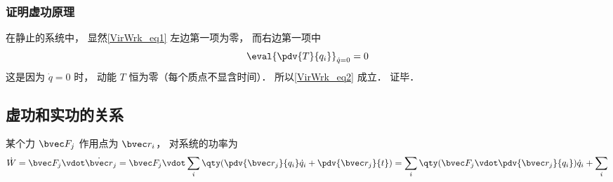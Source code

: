 \subsubsection{证明虚功原理}
在静止的系统中， 显然\autoref{VirWrk_eq1} 左边第一项为零， 而右边第一项中
\begin{equation}
\eval{\pdv{T}{q_i}}_{\dot q = 0} = 0
\end{equation}
这是因为 $\dot q = 0$ 时， 动能 $T$ 恒为零（每个质点不显含时间）． 所以\autoref{VirWrk_eq2} 成立． 证毕．


\subsection{虚功和实功的关系}
某个力 $\bvec F_j$ 作用点为 $\bvec r_i$， 对系统的功率为
\begin{equation}
\dot W = \bvec F_j \vdot \dot {\bvec r}_j
= \bvec F_j \vdot \sum_i \qty(\pdv{\bvec r_j}{q_i} \dot q_i + \pdv{\bvec r_j}{t})
= \sum_i \qty(\bvec F_j \vdot \pdv{\bvec r_j}{q_i}) \dot q_i + \sum_i 
\end{equation}
